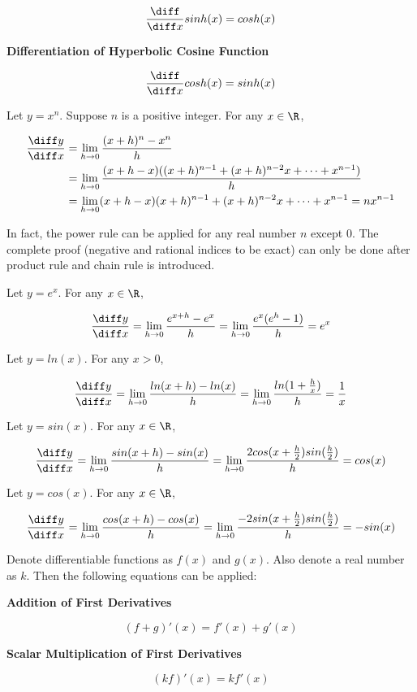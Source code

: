 \begin{thm}
\begin{alist}
    $$\frac{\diff }{\diff  x}sinh(x)=cosh(x)$$

    \item \textbf{Differentiation of Hyperbolic Cosine Function}

    $$\frac{\diff }{\diff  x}cosh(x)=sinh(x)$$
  \end{alist}

   Let $y=x^{n}$. Suppose $n$ is a positive integer. For any $x\in \R$,

  $$\begin{aligned}[t]
    \frac{\diff  y}{\diff  x}&=\lim_{h\to 0}\frac{(x+h)^{n}-x^{n}}{h}\\
    &=\lim_{h\to 0}\frac{(x+h-x)((x+h)^{n-1}+(x+h)^{n-2}x+\cdots+x^{n-1})}{h}\\
    &=\lim_{h\to 0}(x+h-x)(x+h)^{n-1}+(x+h)^{n-2}x+\cdots+x^{n-1}=nx^{n-1}
  \end{aligned}$$\s

  In fact, the power rule can be applied for any real number $n$ except $0$. The complete proof (negative and rational indices to be exact) can only be done after product rule and chain rule is introduced.\n

   Let $y=e^{x}$. For any $x \in \R$,

  $$\frac{\diff  y}{\diff  x}=\lim_{h\to 0}\frac{e^{x+h}-e^{x}}{h}=\lim_{h\to 0}\frac{e^{x}(e^{h}-1)}{h}=e^{x}$$

   Let $y=ln(x)$. For any $x>0$,

  $$\frac{\diff  y}{\diff  x}=\lim_{h\to 0}\frac{ln(x+h)-ln(x)}{h}=\lim_{h\to 0}\frac{ln(1+\frac{h}{x})}{h}=\frac{1}{x}$$

   Let $y=sin(x)$. For any $x\in \R$,

  $$\frac{\diff  y}{\diff  x}=\lim_{h\to 0}\frac{sin(x+h)-sin(x)}{h}=\lim_{h\to 0}\frac{2cos(x+\frac{h}{2})sin(\frac{h}{2})}{h}=cos(x)$$

   Let $y=cos(x)$. For any $x\in \R$,

  $$\frac{\diff  y}{\diff  x}=\lim_{h\to 0}\frac{cos(x+h)-cos(x)}{h}=\lim_{h\to 0}\frac{-2sin(x+\frac{h}{2})sin(\frac{h}{2})}{h}=-sin(x)$$
\end{thm}\n

\begin{thm}
  Denote differentiable functions as $f(x)$ and $g(x)$. Also denote a real number as $k$. Then the following equations can be applied:

  \begin{alist}
    \item \textbf{Addition of First Derivatives}

    $$(f+g)'(x)=f'(x)+g'(x)$$

    \item \textbf{Scalar Multiplication of First Derivatives}

    $$(kf)'(x)=kf'(x)$$
  \end{alist}
\end{thm}

